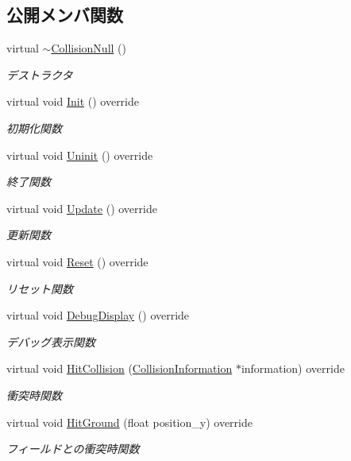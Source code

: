\subsection*{公開メンバ関数}
\begin{DoxyCompactItemize}
\item 
virtual \mbox{\hyperlink{class_collision_null_a8cbc0114a4dcc343635787d50c6ce007}{$\sim$\+Collision\+Null}} ()
\begin{DoxyCompactList}\small\item\em デストラクタ \end{DoxyCompactList}\item 
virtual void \mbox{\hyperlink{class_collision_null_a18cfc21fefcd3e8dec380ac44a85f111}{Init}} () override
\begin{DoxyCompactList}\small\item\em 初期化関数 \end{DoxyCompactList}\item 
virtual void \mbox{\hyperlink{class_collision_null_aafac3fdab43845465fd1e0198c423ccf}{Uninit}} () override
\begin{DoxyCompactList}\small\item\em 終了関数 \end{DoxyCompactList}\item 
virtual void \mbox{\hyperlink{class_collision_null_ad6ac0e9b06fcb4e3d19a5c3c1cadfe7e}{Update}} () override
\begin{DoxyCompactList}\small\item\em 更新関数 \end{DoxyCompactList}\item 
virtual void \mbox{\hyperlink{class_collision_null_a288a42487bf161a02ec716aea246e1a6}{Reset}} () override
\begin{DoxyCompactList}\small\item\em リセット関数 \end{DoxyCompactList}\item 
virtual void \mbox{\hyperlink{class_collision_null_a098fcf2c8ecc3c31706b720fbe852aca}{Debug\+Display}} () override
\begin{DoxyCompactList}\small\item\em デバッグ表示関数 \end{DoxyCompactList}\item 
virtual void \mbox{\hyperlink{class_collision_null_ad3473329f7af1b86ea6dfc1c4e8e81c1}{Hit\+Collision}} (\mbox{\hyperlink{class_collision_information}{Collision\+Information}} $\ast$information) override
\begin{DoxyCompactList}\small\item\em 衝突時関数 \end{DoxyCompactList}\item 
virtual void \mbox{\hyperlink{class_collision_null_ac5645bca5f03262d1918e2ff8348440d}{Hit\+Ground}} (float position\+\_\+y) override
\begin{DoxyCompactList}\small\item\em フィールドとの衝突時関数 \end{DoxyCompactList}\end{DoxyCompactItemize}
